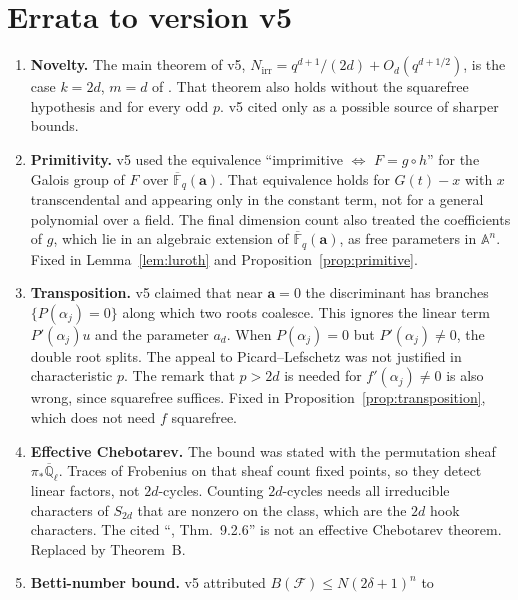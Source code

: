 \documentclass[11pt,a4paper]{article}
\theoremstyle{definition}
\theoremstyle{remark}
\newcommand{\Fqbar}{\overline{\mathbb{F}}_q}
\newcommand{\A}{\mathbb{A}}
\newcommand{\Nirr}{N_{\mathrm{irr}}}
\newcommand{\ba}{\mathbf{a}}
\begin{document}
\appendix
\section{Errata to version v5}\label{app:errata}
\begin{enumerate}[label=E\arabic*.,leftmargin=*]
\item \textbf{Novelty.} The main theorem of v5, $\Nirr=q^{d+1}/(2d)+O_d(q^{d+1/2})$, is the case
      $k=2d$, $m=d$ of \cite[Thm.~2.3]{BBR2015}. That theorem also holds without the squarefree
      hypothesis and for every odd $p$. v5 cited \cite{BBR2015} only as a possible source of sharper bounds.
\item \textbf{Primitivity.} v5 used the equivalence ``imprimitive $\Leftrightarrow$ $F=g\circ h$'' for the
      Galois group of $F$ over $\Fqbar(\ba)$. That equivalence holds for $G(t)-x$ with $x$
      transcendental and appearing only in the constant term, not for a general polynomial over a field.
      The final dimension count also treated the coefficients of $g$, which lie in an algebraic
      extension of $\Fqbar(\ba)$, as free parameters in $\A^n$. Fixed in
      Lemma~\ref{lem:luroth} and Proposition~\ref{prop:primitive}.
\item \textbf{Transposition.} v5 claimed that near $\ba=0$ the discriminant has branches
      $\{P(\alpha_j)=0\}$ along which two roots coalesce. This ignores the linear term
      $P'(\alpha_j)u$ and the parameter $a_d$. When $P(\alpha_j)=0$ but $P'(\alpha_j)\ne0$, the
      double root splits. The appeal to Picard--Lefschetz was not justified in characteristic $p$.
      The remark that $p>2d$ is needed for $f'(\alpha_j)\ne0$ is also wrong, since squarefree suffices.
      Fixed in Proposition~\ref{prop:transposition}, which does not need $f$ squarefree.
\item \textbf{Effective Chebotarev.} The bound was stated with the permutation sheaf $\pi_*\overline{\mathbb Q}_\ell$.
      Traces of Frobenius on that sheaf count fixed points, so they detect linear factors,
      not $2d$-cycles. Counting $2d$-cycles needs all irreducible characters of $S_{2d}$ that are
      nonzero on the class, which are the $2d$ hook characters. The cited
      ``\cite{Katz1988}, Thm.~9.2.6'' is not an effective Chebotarev theorem. Replaced by Theorem~B.
\item \textbf{Betti-number bound.} v5 attributed $B(\mathcal F)\le N(2\delta+1)^n$ to

\end{enumerate}
\end{document}
